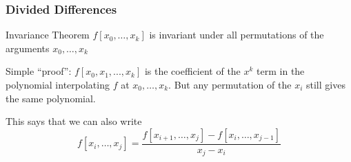 \documentclass[10pt]{beamer}
\begin{document}
\begin{frame}
\frametitle{Divided Differences}
\begin{block}{Invariance Theorem}
    $f[x_0,\dots,x_k]$ is invariant under all permutations of the arguments
    $x_0,\dots,x_k$
\end{block}
Simple ``proof'': $f[x_0,x_1,...,x_k]$ is the coefficient of the $x^k$
term in the polynomial interpolating $f$ at $x_0,\ldots,x_k$.  But any
permutation of the $x_i$ still gives the same polynomial.

This says that we can also write
  \begin{equation*}
    f[x_i,\dots,x_j] = \frac{f[x_{i+1},\dots,x_j]-f[x_i,\dots,x_{j-1}]}{x_j -
    x_i}
  \end{equation*}
\end{frame}
\end{document}
